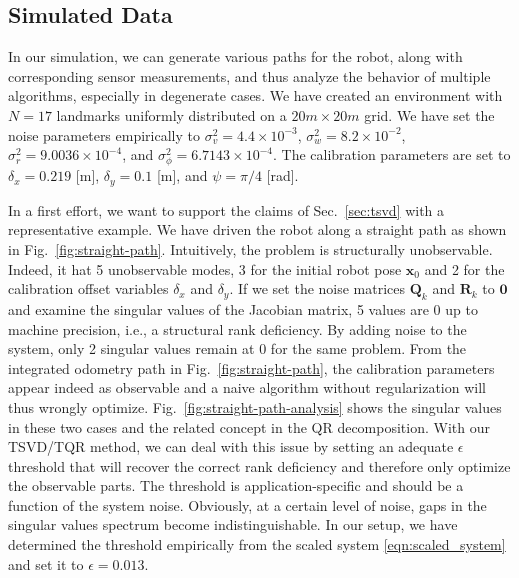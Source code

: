 \subsection{Simulated Data}

In our simulation, we can generate various paths for the robot, along with
corresponding sensor measurements, and thus analyze the behavior of multiple
algorithms, especially in degenerate cases. We have created an environment
with $N=17$ landmarks uniformly distributed on a $20m\times 20m$ grid. We have
set the noise parameters empirically to $\sigma^2_v=4.4\times 10^{-3}$,
$\sigma^2_w=8.2\times 10^{-2}$, $\sigma^2_r=9.0036\times 10^{-4}$, and
$\sigma^2_\phi=6.7143\times 10^{-4}$. The calibration parameters are set to
$\delta_x=0.219$ [m], $\delta_y=0.1$ [m], and $\psi=\pi/4$ [rad].

In a first effort, we want to support the claims of Sec.~\ref{sec:tsvd} with
a representative example. We have driven the robot along a straight
path as shown in Fig.~\ref{fig:straight-path}. Intuitively, the problem is
structurally unobservable. Indeed, it hat 5 unobservable modes, 3 for the
initial robot pose $\mathbf{x}_0$ and 2 for the calibration offset variables
$\delta_x$ and $\delta_y$. If we set the noise matrices $\mathbf{Q}_k$ and
$\mathbf{R}_k$ to $\mathbf{0}$ and examine the singular values of the Jacobian
matrix, 5 values are $0$ up to machine precision, i.e., a structural rank
deficiency. By adding noise to the system, only 2 singular values remain at $0$
for the same problem. From the integrated odometry path in
Fig.~\ref{fig:straight-path}, the calibration parameters appear indeed as
observable and a naive algorithm without regularization will thus wrongly
optimize. Fig.~\ref{fig:straight-path-analysis} shows the singular values in
these two cases and the related concept in the QR decomposition. With our
TSVD/TQR method, we can deal with this issue by setting an adequate $\epsilon$
threshold that will recover the correct rank deficiency and therefore only
optimize the observable parts. The threshold is application-specific and should
be a function of the system noise. Obviously, at a certain level of noise, gaps
in the singular values spectrum become indistinguishable. In our setup, we have
determined the threshold empirically from the scaled system
\eqref{eqn:scaled_system} and set it to $\epsilon=0.013$.

